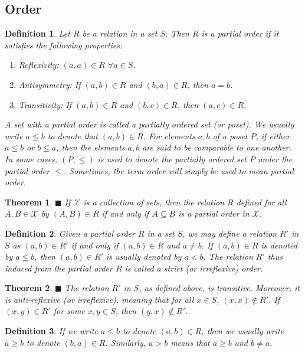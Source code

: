 \documentclass[a4paper]{article}
\newtheorem{mytheorem}{Theorem}
\newtheorem{mydef}{Definition}
\numberwithin{mytheorem}{section}
\numberwithin{mydef}{section}
\numberwithin{axiom}{section}
\numberwithin{example}{section}
\newcommand{\done}{$\blacksquare$ }
\begin{document}
\subsection{Order}

\begin{mydef}Let $R$ be a relation in a set $S$. Then $R$ is a partial order if it satisfies the following properties:
 \begin{enumerate}
 \item Reflexivity: $(a,a) \in R$ $\forall a \in S$. 
 \item Antisymmetry: If $(a,b) \in R$ and $(b,a) \in R$, then $a = b$. 
 \item Transitivity: If $(a,b) \in R$ and $(b,c) \in R$, then $(a,c) \in R$.
 \end{enumerate}
 A set with a partial order is called a partially ordered set (or poset). We usually write $a \leq b$ to denote that $(a,b) \in R$. For elements $a,b$ of a poset $P$, if either $a \leq b$ or $b \leq a$, then the elements $a,b$ are said to be comparable to one another. In some cases, $(P, \leq)$ is used to denote the partially ordered set $P$ under the partial order $\leq$. Sometimes, the term order will simply be used to mean partial order. 
\end{mydef}

\begin{mytheorem} \done If $\mathcal{X}$ is a collection of sets, then the relation $R$ defined for all $A,B \in \mathcal{X}$ by $(A,B) \in R$ if and only if $A \subseteq B$ is a partial order in $\mathcal{X}$.
\end{mytheorem}

\begin{mydef} Given a partial order $R$ in a set $S$, we may define a relation $R'$ in $S$ as $(a,b) \in R'$ if and only if $(a,b) \in R$ and $a \neq b$. If $(a,b) \in R$ is denoted by $a \leq b$, then $(a,b) \in R'$ is usually denoted by $a < b$. The relation $R'$ thus induced from the partial order $R$ is called a strict (or irreflexive) order.
\end{mydef}

\begin{mytheorem} \done The relation $R'$ in $S$, as defined above, is transitive. Moreover, it is anti-reflexive (or irreflexive), meaning that for all $x \in S$, $(x,x) \notin R'$. If $(x,y) \in R'$ for some $x,y \in S$, then $(y,x) \notin R'$.
\end{mytheorem}

\begin{mydef} If we write $a \leq b$ to denote $(a,b) \in R$, then we usually write $a \geq b$ to denote $(b,a) \in R$. Similarly, $a > b$ means that $a \geq b$ and $b \neq a$. 
\end{mydef}
\end{document}
